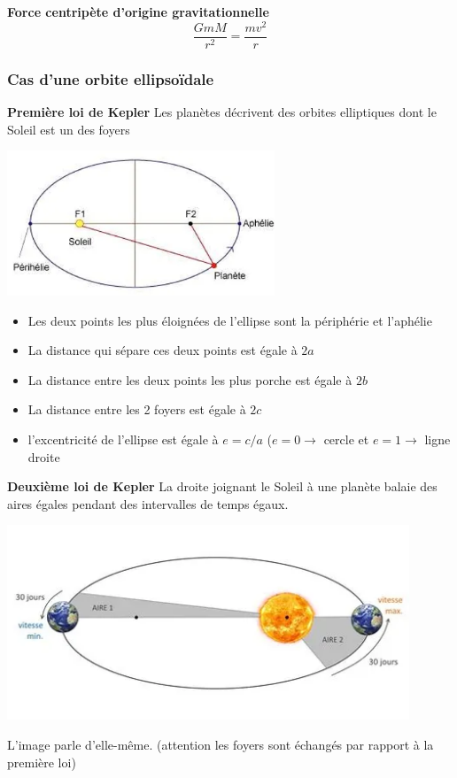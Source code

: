\documentclass{article}
\begin{document}
\noindent
\textbf{Force centripète d'origine gravitationnelle}
\[\frac{GmM}{r^2} = \frac{mv^2}{r}\]

\subsubsection{Cas d'une orbite ellipsoïdale}
\textbf{Première loi de Kepler}
\newline
Les planètes décrivent des orbites elliptiques dont le Soleil est un des foyers
\begin{center}
    \includegraphics[width=8cm]{Image/PremierKelper.png}
\end{center}
\begin{itemize}
    \item Les deux points les plus éloignées de l'ellipse sont la périphérie et l'aphélie
    \item La distance qui sépare ces deux points est égale à $2a$
    \item La distance entre les deux points les plus porche est égale à $2b$
    \item La distance entre les 2 foyers est égale à $2c$
    \item l'excentricité de l'ellipse est égale à $e=c/a$ ($e = 0\rightarrow$ cercle et $e = 1\rightarrow$ ligne droite
\end{itemize}
\newline

\noindent
\textbf{Deuxième loi de Kepler}
\newline
La droite joignant le Soleil à une planète balaie des aires égales pendant des intervalles de temps égaux.
\begin{center}
    \includegraphics[width=12cm]{Image/DeuxiemeKelper.png}
\end{center}
L'image parle d'elle-même. (attention les foyers sont échangés par rapport à la première loi)
\newline
\end{document}
